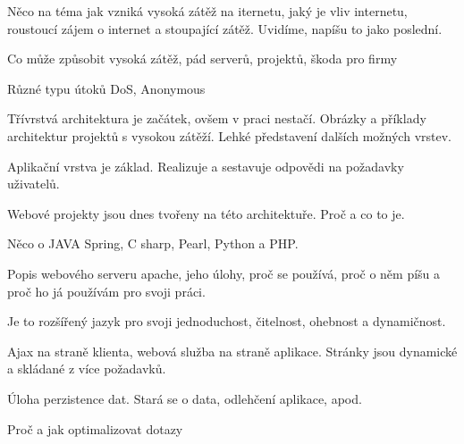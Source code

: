 \documentclass[12pt]{article}
\begin{document}
\pagestyle{headings}


\obsah
{}



Něco na téma jak vzniká vysoká zátěž na iternetu, jaký je vliv internetu, roustoucí zájem o internet a stoupající zátěž. Uvidíme, napíšu to jako poslední.


Co může způsobit vysoká zátěž, pád serverů, projektů, škoda pro firmy


Různé typu útoků DoS, Anonymous


Třívrstvá architektura je začátek, ovšem v praci nestačí. Obrázky a příklady architektur projektů s vysokou zátěží. Lehké představení dalších možných vrstev.


Aplikační vrstva je základ. Realizuje a sestavuje odpovědi na požadavky uživatelů.

Webové projekty jsou dnes tvořeny na této architektuře. Proč a co to je.

Něco o JAVA Spring, C sharp, Pearl, Python a PHP.

Popis webového serveru apache, jeho úlohy, proč se používá, proč o něm píšu a proč ho já používám pro svoji práci.

Je to rozšířený jazyk pro svoji jednoduchost, čitelnost, ohebnost a dynamičnost.

Ajax na straně klienta, webová služba na straně aplikace. Stránky jsou dynamické a skládané z více požadavků.



Úloha perzistence dat. Stará se o data, odlehčení aplikace, apod.

Proč a jak optimalizovat dotazy
\end{document}
